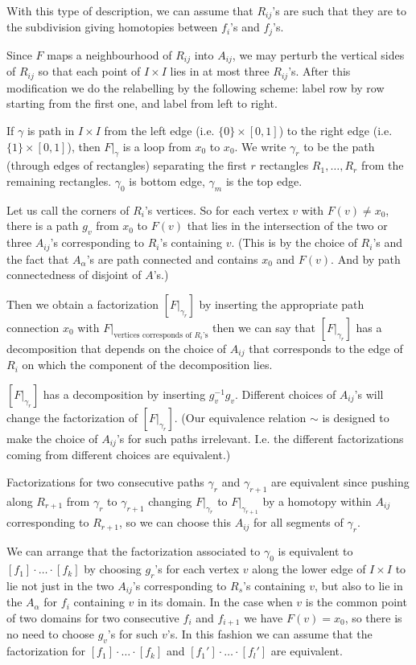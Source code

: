 \documentclass[12pt]{article}					%
\begin{document}
\begin{dukaz}
		With this type of description, we can assume that $R_{ij}$'s are such that they are to the subdivision giving homotopies between $f_i$'s and $f_j$'s.

		Since $F$ maps a neighbourhood of $R_{ij}$ into $A_{ij}$, we may perturb the vertical sides of $R_{ij}$ so that each point of $I \times I$ lies in at most three $R_{ij}$'s. After this modification we do the relabelling by the following scheme: label row by row starting from the first one, and label from left to right.

		If $γ$ is path in $I \times I$ from the left edge (i.e. $\{0\} \times [0, 1]$) to the right edge (i.e. $\{1\} \times [0, 1]$), then $F|_γ$ is a loop from $x_0$ to $x_0$. We write $γ_r$ to be the path (through edges of rectangles) separating the first $r$ rectangles $R_1, …, R_r$ from the remaining rectangles. $γ_0$ is bottom edge, $γ_m$ is the top edge.

		Let us call the corners of $R_i$'s vertices. So for each vertex $v$ with $F(v) ≠ x_0$, there is a path $g_v$ from $x_0$ to $F(v)$ that lies in the intersection of the two or three $A_{ij}$'s corresponding to $R_i$'s containing $v$. (This is by the choice of $R_i$'s and the fact that $A_α$'s are path connected and contains $x_0$ and $F(v)$. And by path connectedness of disjoint of $A$'s.)

		Then we obtain a factorization $[F|_{γ_r}]$ by inserting the appropriate path connection $x_0$ with $F|_{\text{vertices corresponds of $R_i$'s}}$ then we can say that $[F|_{γ_r}]$ has a decomposition that depends on the choice of $A_{ij}$ that corresponds to the edge of $R_i$ on which the component of the decomposition lies.

		$[F|_{γ_r}]$ has a decomposition by inserting $g_v^{-1} g_v$. Different choices of $A_{ij}$'s will change the factorization of $[F|_{γ_r}]$. (Our equivalence relation $\sim$ is designed to make the choice of $A_{ij}$'s for such paths irrelevant. I.e. the different factorizations coming from different choices are equivalent.)

		Factorizations for two consecutive paths $γ_r$ and $γ_{r+1}$ are equivalent since pushing along $R_{r+1}$ from $γ_r$ to $γ_{r+1}$ changing $F|_{γ_r}$ to $F|_{γ_{r+1}}$ by a homotopy within $A_{ij}$ corresponding to $R_{r+1}$, so we can choose this $A_{ij}$ for all segments of $γ_r$.

		We can arrange that the factorization associated to $γ_0$ is equivalent to $[f_1]·…·[f_k]$ by choosing $g_r$'s for each vertex $v$ along the lower edge of $I \times I$ to lie not just in the two $A_{ij}$'s corresponding to $R_s$'s containing $v$, but also to lie in the $A_α$ for $f_i$ containing $v$ in its domain. In the case when $v$ is the common point of two domains for two consecutive $f_i$ and $f_{i+1}$ we have $F(v) = x_0$, so there is no need to choose $g_v$'s for such $v$'s. In this fashion we can assume that the factorization for $[f_1]·…·[f_k]$ and $[f_1']·…·[f_l']$ are equivalent.
	\end{dukaz}
\end{document}
